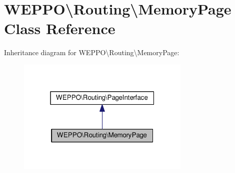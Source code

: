 \hypertarget{classWEPPO_1_1Routing_1_1MemoryPage}{}\section{W\+E\+P\+PO\textbackslash{}Routing\textbackslash{}Memory\+Page Class Reference}
\label{classWEPPO_1_1Routing_1_1MemoryPage}


Inheritance diagram for W\+E\+P\+PO\textbackslash{}Routing\textbackslash{}Memory\+Page\+:\nopagebreak
\begin{figure}[H]
\begin{center}
\leavevmode
\includegraphics[width=235pt]{classWEPPO_1_1Routing_1_1MemoryPage__inherit__graph}
\end{center}
\end{figure}
